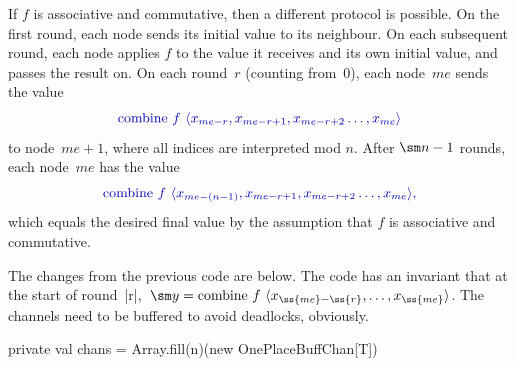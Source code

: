 \begin{answerI}


If $f$ is associative and commutative, then a different protocol is possible.
On the first round, each node sends its initial value to its neighbour.  On
each subsequent round, each node applies $f$ to the value it receives and its
own initial value, and passes the result on.  On each round~$r$ (counting
from~0), each node~$me$ sends the value
\[\mstyle
\mathrm{combine}~f~ \seq{x_{me-r}, x_{me-r+1}, x_{me-r+2} \ldots, x_{me}}
\]
to node~$me+1$, where all indices are interpreted mod $n$. 
After $\sm n-1$ rounds, each node~$me$ has the value
\[\mstyle
\mathrm{combine}~f~ \seq{x_{me-(n-1)}, x_{me-r+1}, x_{me-r+2} \ldots, x_{me}},
\]
which equals  the desired final value by the assumption that $f$ is
associative and commutative.

The changes from the previous code are below.  The code has an invariant that
at the start of round~|r|,\, $\sm y = \mathrm{combine}
\linebreak[1]\ f \linebreak[1]\ \seq{x_{\ss{me}-\ss{r}},  \ldots,
  x_{\ss{me}}}$.  The channels need to be buffered to avoid deadlocks, obviously.
%
\begin{scala}
  private val chans = Array.fill(n)(new OnePlaceBuffChan[T]) 


\end{scala}
\end{answerI}
